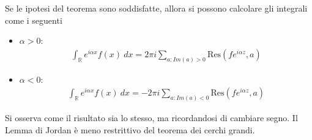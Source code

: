 \documentclass[a4paper, oneside]{article}
\begin{document}
Se le ipotesi del teorema sono soddisfatte, allora si possono calcolare 
gli integrali come i seguenti
\begin{itemize}
    \item $\alpha > 0$:
    \begin{gather*}
        \int_{\mathbb{R}} e^{i\alpha x} f(x) \ d x= 2\pi i \sum_{a : Im(a) > 0 } \text{Res}(fe^{i\alpha z}, a)  
    \end{gather*}
    \item $\alpha < 0$:
    \begin{gather*}
        \int_{\mathbb{R}} e^{i\alpha x} f(x) \ d x = -2\pi i \sum_{a : Im(a) < 0 } \text{Res}(fe^{i\alpha z}, a)
    \end{gather*}
\end{itemize}
Si osserva come il risultato sia lo stesso, ma ricordandosi di cambiare segno. Il Lemma di Jordan 
è meno restrittivo del teorema dei cerchi grandi.

\begin{example}[Dispense]
    
\end{example}
\end{document}
